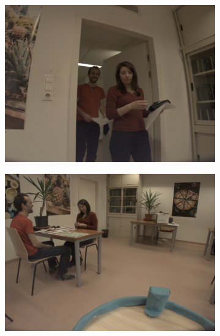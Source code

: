 \begin{figure}
    \centering
    \begin{subfigure}[b]{0.45\linewidth}
        \includegraphics[width=\linewidth]{figures/video_examples/video_example_door.png}
    \end{subfigure}
    \begin{subfigure}[b]{0.45\linewidth}
        \includegraphics[width=\linewidth]{figures/video_examples/video_example_table_1.png}
    \end{subfigure}
    \begin{subfigure}[b]{0.45\linewidth}

\end{subfigure}
\end{figure}
